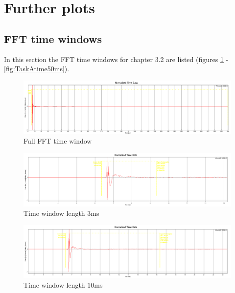 \documentclass{article}
\begin{document}
\section{Further plots}
\subsection{FFT time windows}
In this section the FFT time windows for chapter 3.2 are listed (figures \ref{fig:TaskAtimecomplete} - \ref{fig:TaskAtime50ms}).
\begin{figure}[htbp]
\begin{center}
\includegraphics[width=15cm,keepaspectratio=true]{Figures/TaskAtimecomplete}
\caption{Full FFT time window}
\label{fig:TaskAtimecomplete}
\end{center}
\end{figure}
\begin{figure}[htbp]
\begin{center}
\includegraphics[width=15cm,keepaspectratio=true]{Figures/TaskAtime3ms}
\caption{Time window length 3ms}
\label{fig:TaskAtime3ms}
\end{center}
\end{figure}
\begin{figure}[htbp]
\begin{center}
\includegraphics[width=15cm,keepaspectratio=true]{Figures/TaskAtime10ms}
\caption{Time window length 10ms}
\label{fig:TaskAtime10ms}
\end{center}
\end{figure}
\end{document}
